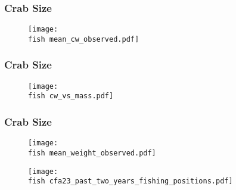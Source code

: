 \documentclass{beamer}
\begin{document}

\begin{frame}
\frametitle{Crab Size}
\begin{figure}

 \vspace*{-.5cm}
 \centerline{\texttt{[image: \\fish mean\_cw\_observed.pdf]}}

 \end{figure}
\end{frame}


\begin{frame}
\frametitle{Crab Size}
\begin{figure}

 \vspace*{-.5cm}
 \centerline{\texttt{[image: \\fish cw\_vs\_mass.pdf]}}

 \end{figure}
\end{frame}


\begin{frame}
\frametitle{Crab Size}
\begin{figure}

 \vspace*{-.5cm}
 \centerline{\texttt{[image: \\fish mean\_weight\_observed.pdf]}}

 \end{figure}
\end{frame}


\begin{frame}
\begin{figure}

 \vspace*{-.3cm}
 \centerline{\texttt{[image: \\fish cfa23\_past\_two\_years\_fishing\_positions.pdf]}}

 \end{figure}
\end{frame}
\end{document}

